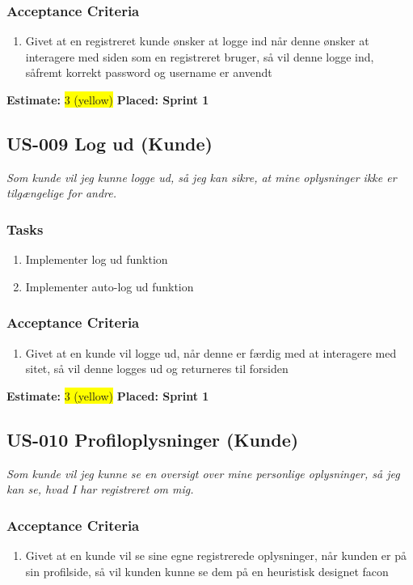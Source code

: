 \subsubsection*{\textbf{Acceptance Criteria}}
\begin{enumerate}
  \item Givet at en registreret kunde ønsker at logge ind når denne ønsker at interagere med siden som en registreret bruger, så vil denne logge ind, såfremt korrekt password og username er anvendt
\end{enumerate}
\textbf{Estimate:} \colorbox{yellow}{3 (yellow)}
\textbf{Placed: Sprint 1}
\par\noindent\dotfill

\subsection{US-009 Log ud (Kunde)}
\label{sec:US-009}
\textit{Som kunde vil jeg kunne logge ud, så jeg kan sikre, at mine oplysninger ikke er tilgængelige for andre.}
\subsubsection*{\textbf{Tasks}}
\begin{enumerate}
  \item Implementer log ud funktion
  \item Implementer auto-log ud funktion
\end{enumerate}
\subsubsection*{\textbf{Acceptance Criteria}}
\begin{enumerate}
  \item Givet at en kunde vil logge ud, når denne er færdig med at interagere med sitet, så vil denne logges ud og returneres til forsiden
\end{enumerate}
\textbf{Estimate:} \colorbox{yellow}{3 (yellow)}
\textbf{Placed: Sprint 1}
\par\noindent\dotfill

\subsection{US-010 Profiloplysninger (Kunde)}
\label{sec:US-010}
\textit{Som kunde vil jeg kunne se en oversigt over mine personlige oplysninger, så jeg kan se, hvad I har registreret om mig.}
\subsubsection*{\textbf{Acceptance Criteria}}
\begin{enumerate}
  \item Givet at en kunde vil se sine egne registrerede oplysninger, når kunden er på sin profilside, så vil kunden kunne se dem på en heuristisk designet facon
\end{enumerate}
